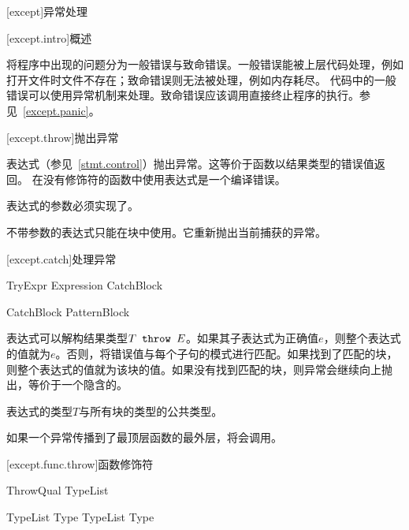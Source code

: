 
[except]{异常处理}

[except.intro]{概述}

\pnum
\X 将程序中出现的问题分为一般错误与致命错误。一般错误能被上层代码处理，例如打开文件时文件不存在；致命错误则无法被处理，例如内存耗尽。
代码中的一般错误可以使用异常机制来处理。致命错误应该调用直接终止程序的执行。参见~\ref{except.panic}。

[except.throw]{抛出异常}

\pnum
{}表达式（参见~\ref{stmt.control}）抛出异常。这等价于函数以结果类型的错误值返回。
在没有修饰符的函数中使用表达式是一个编译错误。

\pnum
{}表达式的参数必须实现了。

\pnum
不带参数的表达式只能在块中使用。它重新抛出当前捕获的异常。

[except.catch]{处理异常}

\begin{bnf}{TryExpr}
     Expression CatchBlock\bnfs
\end{bnf}

\begin{bnf}{CatchBlock}
     Pattern\bnfq Block
\end{bnf}

\pnum
{}表达式可以解构结果类型$T\texttt{ throw }E$。如果其子表达式为正确值$e$，则整个表达式的值就为$e$。否则，将错误值与每个子句的模式进行匹配。如果找到了匹配的块，则整个表达式的值就为该块的值。如果没有找到匹配的块，则异常会继续向上抛出，等价于一个隐含的。

\pnum
{}表达式的类型$T$与所有块的类型的公共类型。

\pnum
如果一个异常传播到了最顶层函数的最外层，将会调用。

[except.func.throw]{函数修饰符}

\begin{bnf}{ThrowQual}
     \terminal{(} TypeList\bnfs \terminal{)} \br
\end{bnf}

\begin{bnf}{TypeList}
    Type \br
    TypeList \terminal{,} Type
\end{bnf}

